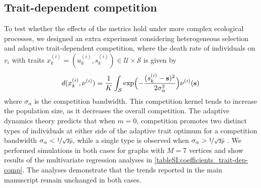 \subsection{Trait-dependent competition}\label{secSI:trait-dep-comp}
To test whether the effects of the metrics hold under more complex ecological processes, we designed an extra experiment considering heterogeneous selection and adaptive trait-dependent competition, where the death rate of individuals on $v_i$ with traits $x_k^{(i)} = (u_k^{(i)}, s_k^{(i)}) \in \mathcal{U} \times \mathcal{S}$ is given by
\begin{equation}
    d(x_k^{(i)}, \nu^{(i)}) = \frac{1}{K}\int_{\mathcal{S}} \exp\Bigl(-\frac{(s_k^{(i)} - {\textbf s})^2}{2\sigma_\alpha^{2}} \Bigr) \nu^{(i)}({\textbf s})
\end{equation}
where $\sigma_\alpha$ is the competition bandwidth.
This competition kernel tends to increase the population size, as it decreases the overall competition. The adaptive dynamics theory predicts that when $m = 0$, competition promotes two distinct types of individuals at either side of the adaptive trait optimum for a competition bandwidth $\sigma_\alpha < \nicefrac{1}{\sqrt{2p}}$, while a single type is observed when $\sigma_\alpha > \nicefrac{1}{\sqrt{2p}}$ \citep{DoebeliMichael2011Ad}.
We performed simulations in both cases for graphs with $M=7$ vertices and show results of the multivariate regression analyses in \cref{tableSI:coefficients_trait-dep-comp}.
The analyses demonstrate that the trends reported in the main manuscript remain unchanged in both cases.

